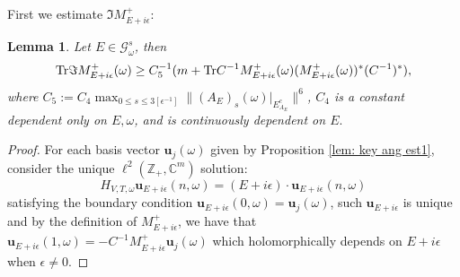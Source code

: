 \documentclass[11pt]{amsart}
\newtheorem{lemma}[theorem]{Lemma}
\theoremstyle{remark}
\theoremstyle{definition}
\newcommand{\tr}{{\rm Tr}}
\begin{document}
First we estimate $\Im M_{E+i\epsilon}^{+}$:
\begin{lemma}\label{imm}
    Let $E\in \mathcal{G}_\omega^s$, then 
    \begin{equation}\label{eqn: criterion key ineq}
     \tr\Im M_{E+i\epsilon}^+(\omega)\geq 
	 C_5^{-1}(m+\tr C^{-1} M_{E+i\epsilon}^+(\omega)(M_{E+i\epsilon}^+(\omega))^\ast(C^{-1})^*),   
    \end{equation}
	 where $C_5:=C_4\max_{0\leq s\leq 3[\epsilon^{-1}]}\|(A_E)_{s}(\omega)|_{E^c_{A_E}}\|^6$, $C_4$ is a constant dependent only on $E,\omega$, and is continuously dependent on $E.$
\end{lemma}
\begin{proof}


For each basis vector $\mathbf{u}_j(\omega)$ given by Proposition \ref{lem: key ang est1}, consider the unique $\ell^2(\mathbb{Z}_+,\mathbb{C}^m)$ solution:
\begin{equation*}
	H_{V,T,\omega}\mathbf{u}_{E+i\epsilon}(n,\omega) = (E+i\epsilon)\cdot \mathbf{u}_{E+i\epsilon}(n,\omega)
\end{equation*}
satisfying the boundary condition  $\mathbf{u}_{E+i\epsilon}(0,\omega)=\mathbf{u}_j(\omega)$, such $\mathbf{u}_{E+i\epsilon}$ is unique and by the definition of $M^+_{E+i\epsilon}$, we have that $\mathbf{u}_{E+i\epsilon}(1,\omega)=-C^{-1}M_{E+i\epsilon}^+\mathbf{u}_j(\omega)$ which holomorphically depends on $E+i\epsilon$ when $\epsilon\neq 0$.


\end{proof}
\end{document}
